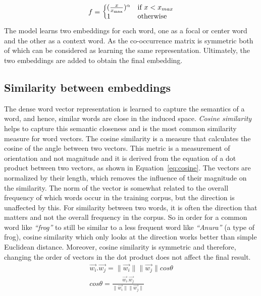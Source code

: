 \begin{equation}
f=\left\{
  \begin{array}{@{}ll@{}}
    (\frac { x }{ { x }_{ \max } } )^{ \alpha  }& \text{if}\ x<x_{max} \\
    1 & \text{otherwise}
  \end{array}\right.
\label{eq:weighingfunction}
\end{equation}
\noindent
The model learns two embeddings for each word, one as a focal or center word and the other as a context word. As the co-occurrence matrix is symmetric both of which can be considered as learning the same representation. Ultimately, the two embeddings are added to obtain the final embedding.
\subsection{Similarity between embeddings}\label{sec:similarity}
The dense word vector representation is learned to capture the semantics of a word, and hence, similar words are close in the induced space. \emph{Cosine similarity} helps to capture this semantic closeness and is the most common similarity measure for  word vectors. The cosine similarity is a measure that calculates the cosine of the angle between two vectors. This metric is a measurement of orientation and not magnitude and it is derived from the equation of a dot product between two vectors, as shown in Equation~\ref{eq:cosine}. The vectors are normalized by their length, which removes the influence of their magnitude on the similarity. The norm of the vector is somewhat related to the overall frequency of which words occur in the training corpus, but the direction is unaffected by this. For similarity between two words, it is often the direction that matters and not the overall frequency in the corpus. So in order for a common word like \emph{``frog''} to still be similar to a less frequent word like \emph{``Anura''} (a type of frog), cosine similarity which only looks at the direction works better than simple Euclidean distance. Moreover, cosine similarity is symmetric and therefore, changing the order of vectors in the dot product does not affect the final result.
\begin{equation}
\begin{split}
\overrightarrow { w_i } .\overrightarrow { w_j } =\parallel \overrightarrow { w_i } \parallel \parallel \overrightarrow { w_j } \parallel cos\theta 
\\
cos\theta =\frac { \overrightarrow { w_i } .\overrightarrow { w_j }  }{ \parallel \overrightarrow { w_i } \parallel \parallel \overrightarrow { w_j } \parallel  } 
\end{split}
\label{eq:cosine}
\end{equation}
